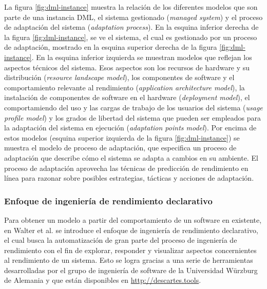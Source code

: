 La figura \ref{fig:dml-instance} muestra la relación de los diferentes modelos que son parte de una instancia DML, el sistema gestionado (\emph{managed system}) y el proceso de adaptación del sistema (\emph{adaptation process}). En la esquina inferior derecha de la figura \ref{fig:dml-instance}, se ve el sistema, el cual es gestionado por un proceso de adaptación, mostrado en la esquina superior derecha de la figura \ref{fig:dml-instance}. En la esquina inferior izquierda se muestran modelos que reflejan los aspectos técnicos del sistema. Esos aspectos son los recursos de hardware y su distribución (\emph{resource landscape model}), los componentes de software y el comportamiento relevante al rendimiento (\emph{application architecture model}), la instalación de componentes de software en el hardware (\emph{deployment model}), el comportamiendo del uso y las cargas de trabajo de los usuarios del sistema (\emph{usage profile model}) y los grados de libertad del sistema que pueden ser empleados para la adaptación del sistema en ejecución (\emph{adaptation points model}). Por encima de estos modelos (esquina superior izquierda de la figura \ref{fig:dml-instance}) se muestra el modelo de proceso de adaptación, que especifica un proceso de adaptación que describe cómo el sistema se adapta a cambios en su ambiente. El proceso de adaptación aprovecha las técnicas de predicción de rendimiento en línea para razonar sobre posibles estrategias, tácticas y acciones de adaptación.

\subsubsection{Enfoque de ingeniería de rendimiento declarativo}

Para obtener un modelo a partir del comportamiento de un software en existente, en Walter et al.\cite{Walter:2018:TDP:3185768.3185777} se introduce el enfoque de ingeniería de rendimiento declarativo, el cual busca la automatización de gran parte del proceso de ingeniería de rendimiento  con el fin de explorar, responder y visualizar aspectos concernientes al rendimiento de un sistema. Esto se logra gracias a una serie de herramientas desarrolladas por el grupo de ingeniería de software de la Universidad Würzburg de Alemania y que están disponibles en \url{http://descartes.tools}.

